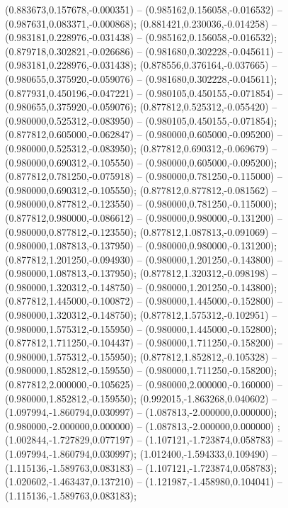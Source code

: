  (0.883673,0.157678,-0.000351) -- (0.985162,0.156058,-0.016532) -- (0.987631,0.083371,-0.000868);
 (0.881421,0.230036,-0.014258) -- (0.983181,0.228976,-0.031438) -- (0.985162,0.156058,-0.016532);
 (0.879718,0.302821,-0.026686) -- (0.981680,0.302228,-0.045611) -- (0.983181,0.228976,-0.031438);
 (0.878556,0.376164,-0.037665) -- (0.980655,0.375920,-0.059076) -- (0.981680,0.302228,-0.045611);
 (0.877931,0.450196,-0.047221) -- (0.980105,0.450155,-0.071854) -- (0.980655,0.375920,-0.059076);
 (0.877812,0.525312,-0.055420) -- (0.980000,0.525312,-0.083950) -- (0.980105,0.450155,-0.071854);
 (0.877812,0.605000,-0.062847) -- (0.980000,0.605000,-0.095200) -- (0.980000,0.525312,-0.083950);
 (0.877812,0.690312,-0.069679) -- (0.980000,0.690312,-0.105550) -- (0.980000,0.605000,-0.095200);
 (0.877812,0.781250,-0.075918) -- (0.980000,0.781250,-0.115000) -- (0.980000,0.690312,-0.105550);
 (0.877812,0.877812,-0.081562) -- (0.980000,0.877812,-0.123550) -- (0.980000,0.781250,-0.115000);
 (0.877812,0.980000,-0.086612) -- (0.980000,0.980000,-0.131200) -- (0.980000,0.877812,-0.123550);
 (0.877812,1.087813,-0.091069) -- (0.980000,1.087813,-0.137950) -- (0.980000,0.980000,-0.131200);
 (0.877812,1.201250,-0.094930) -- (0.980000,1.201250,-0.143800) -- (0.980000,1.087813,-0.137950);
 (0.877812,1.320312,-0.098198) -- (0.980000,1.320312,-0.148750) -- (0.980000,1.201250,-0.143800);
 (0.877812,1.445000,-0.100872) -- (0.980000,1.445000,-0.152800) -- (0.980000,1.320312,-0.148750);
 (0.877812,1.575312,-0.102951) -- (0.980000,1.575312,-0.155950) -- (0.980000,1.445000,-0.152800);
 (0.877812,1.711250,-0.104437) -- (0.980000,1.711250,-0.158200) -- (0.980000,1.575312,-0.155950);
 (0.877812,1.852812,-0.105328) -- (0.980000,1.852812,-0.159550) -- (0.980000,1.711250,-0.158200);
 (0.877812,2.000000,-0.105625) -- (0.980000,2.000000,-0.160000) -- (0.980000,1.852812,-0.159550);
 (0.992015,-1.863268,0.040602) -- (1.097994,-1.860794,0.030997) -- (1.087813,-2.000000,0.000000);
 (0.980000,-2.000000,0.000000) -- (1.087813,-2.000000,0.000000) ;
 (1.002844,-1.727829,0.077197) -- (1.107121,-1.723874,0.058783) -- (1.097994,-1.860794,0.030997);
 (1.012400,-1.594333,0.109490) -- (1.115136,-1.589763,0.083183) -- (1.107121,-1.723874,0.058783);
 (1.020602,-1.463437,0.137210) -- (1.121987,-1.458980,0.104041) -- (1.115136,-1.589763,0.083183);
